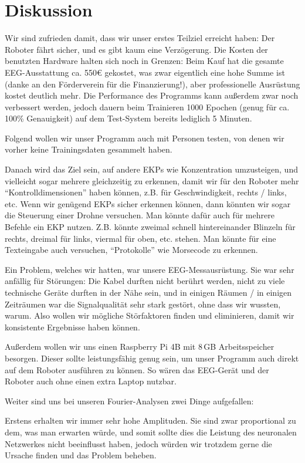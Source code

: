 \documentclass[11pt]{scrartcl}
\begin{document}
	\section{Diskussion}

	Wir sind zufrieden damit, dass wir unser erstes Teilziel erreicht haben: Der Roboter fährt sicher, und es gibt kaum eine Verzögerung. Die Kosten der benutzten Hardware halten sich noch in Grenzen: Beim Kauf hat die gesamte EEG-Ausstattung ca. 550€ gekostet, was zwar eigentlich eine hohe Summe ist (danke an den Förderverein für die Finanzierung!), aber professionelle Ausrüstung kostet deutlich mehr. Die Performance des Programms kann außerdem zwar noch verbessert werden, jedoch dauern beim Trainieren 1000 Epochen (genug für ca. 100\% Genauigkeit) auf dem Test-System bereits lediglich 5 Minuten. 

	Folgend wollen wir unser Programm auch mit Personen testen, von denen wir vorher keine Trainingsdaten gesammelt haben.

	Danach wird das Ziel sein, auf andere EKPs wie Konzentration umzusteigen, und vielleicht sogar mehrere gleichzeitig zu erkennen, damit wir für den Roboter mehr \enquote{Kontrolldimensionen} haben können, z.B. für Geschwindigkeit, rechts / links, etc. Wenn wir genügend EKPs sicher erkennen können, dann könnten wir sogar die Steuerung einer Drohne versuchen. Man könnte dafür auch für mehrere Befehle ein EKP nutzen. Z.B. könnte zweimal schnell hintereinander Blinzeln für rechts, dreimal für links, viermal für oben, etc. stehen. Man könnte für eine Texteingabe auch versuchen, \enquote{Protokolle} wie Morsecode zu erkennen.

	Ein Problem, welches wir hatten, war unsere EEG-Messausrüstung. Sie war sehr anfällig für Störungen: Die Kabel durften nicht berührt werden, nicht zu viele technische Geräte durften in der Nähe sein, und in einigen Räumen / in einigen Zeiträumen war die Signalqualität sehr stark gestört, ohne dass wir wussten, warum. Also wollen wir mögliche Störfaktoren finden und eliminieren, damit wir konsistente Ergebnisse haben können.

	Außerdem wollen wir uns einen Raspberry Pi 4B mit 8\,GB Arbeitsspeicher besorgen. Dieser sollte leistungsfähig genug sein, um unser Programm auch direkt auf dem Roboter ausführen zu können. So wären das EEG-Gerät und der Roboter auch ohne einen extra Laptop nutzbar.

	Weiter sind uns bei unseren Fourier-Analysen zwei Dinge aufgefallen:

	Erstens erhalten wir immer sehr hohe Amplituden. Sie sind zwar proportional zu dem, was man erwarten würde, und somit sollte dies die Leistung des neuronalen Netzwerkes nicht beeinflusst haben, jedoch würden wir trotzdem gerne die Ursache finden und das Problem beheben. 
\end{document}
